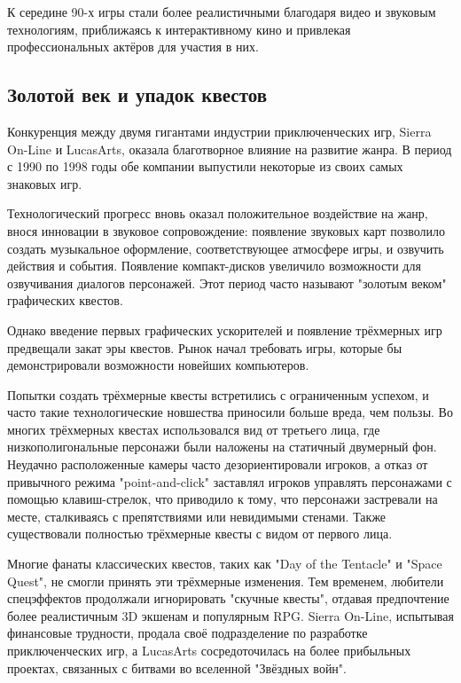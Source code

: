К середине 90-х игры стали более реалистичными благодаря видео и звуковым технологиям, приближаясь к интерактивному кино и привлекая профессиональных актёров для участия в них.

\subsection{Золотой век и упадок квестов}

Конкуренция между двумя гигантами индустрии приключенческих игр, Sierra On-Line и LucasArts, оказала благотворное влияние на развитие жанра. В период с 1990 по 1998 годы обе компании выпустили некоторые из своих самых знаковых игр.

Технологический прогресс вновь оказал положительное воздействие на жанр, внося инновации в звуковое сопровождение: появление звуковых карт позволило создать музыкальное оформление, соответствующее атмосфере игры, и озвучить действия и события. Появление компакт-дисков увеличило возможности для озвучивания диалогов персонажей. Этот период часто называют "золотым веком" графических квестов.

Однако введение первых графических ускорителей и появление трёхмерных игр предвещали закат эры квестов. Рынок начал требовать игры, которые бы демонстрировали возможности новейших компьютеров.

Попытки создать трёхмерные квесты встретились с ограниченным успехом, и часто такие технологические новшества приносили больше вреда, чем пользы. Во многих трёхмерных квестах использовался вид от третьего лица, где низкополигональные персонажи были наложены на статичный двумерный фон. Неудачно расположенные камеры часто дезориентировали игроков, а отказ от привычного режима "point-and-click" заставлял игроков управлять персонажами с помощью клавиш-стрелок, что приводило к тому, что персонажи застревали на месте, сталкиваясь с препятствиями или невидимыми стенами. Также существовали полностью трёхмерные квесты с видом от первого лица.

Многие фанаты классических квестов, таких как "Day of the Tentacle" и "Space Quest", не смогли принять эти трёхмерные изменения. Тем временем, любители спецэффектов продолжали игнорировать "скучные квесты", отдавая предпочтение более реалистичным 3D экшенам и популярным RPG. Sierra On-Line, испытывая финансовые трудности, продала своё подразделение по разработке приключенческих игр, а LucasArts сосредоточилась на более прибыльных проектах, связанных с битвами во вселенной "Звёздных войн".


